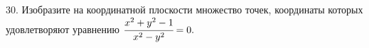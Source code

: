 30. Изобразите на координатной плоскости множество точек, координаты которых удовлетворяют уравнению $\cfrac{x^2+y^2-1}{x^2-y^2}=0.$\\
